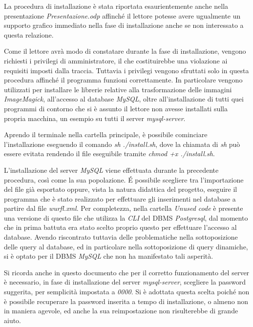 \documentclass[paper=a4, oneside, fontsize=14pt, titlepage]{article}
\begin{document}
			\begin{flushleft}
				La procedura di installazione è stata riportata esaurientemente anche nella presentazione \textit{Presentazione.odp} affinché il lettore potesse avere ugualmente un supporto grafico immediato nella fase di installazione anche se non interessato a questa relazione.\newline
				
				Come il lettore avrà modo di constatare durante la fase di installazione, vengono richiesti i privilegi di amministratore, il che costituirebbe una violazione ai requisiti imposti dalla traccia. Tuttavia i privilegi vengono sfruttati solo in questa procedura affinché il programma funzioni correttamente. In particolare vengono utilizzati per installare le librerie relative alla trasformazione delle immagini \textit{ImageMagick}, all'accesso al database \textit{MySQL}, oltre all'installazione di tutti quei programmi di contorno che si è assunto il lettore non avesse installati sulla propria macchina, un esempio su tutti il server \textit{mysql-server}.\newline
				
				Aprendo il terminale nella cartella principale, è possibile cominciare l'installazione eseguendo il comando \textit{sh ./install.sh}, dove la chiamata di \textit{sh} può essere evitata rendendo il file eseguibile tramite \textit{chmod +x ./install.sh}.
				
				L'installazione del server \textit{MySQL} viene effettuata durante la precedente procedura, così come la sua popolazione. \'{E} possibile scegliere tra l'importazione del file già esportato oppure, vista la natura didattica del progetto, eseguire il programma che è stato realizzato per effettuare gli inserimenti nel database a partire dal file \textit{wurfl.xml}. Per completezza, nella cartella \textit{Unused code} è presente una versione di questo file che utilizza la \textit{CLI} del DBMS \textit{Postgresql}, dal momento che in prima battuta era stato scelto proprio questo per effettuare l'accesso al database. Avendo riscontrato tuttavia delle problematiche nella sottoposizione delle query al database, ed in particolare nella sottoposizione di query dinamiche, si è optato per il DBMS \textit{MySQL} che non ha manifestato tali asperità.
				
				Si ricorda anche in questo documento che per il corretto funzionamento del server è necessario, in fase di installazione del server \textit{mysql-server}, scegliere la password suggerita, per semplicità impostata a \textit{0000}. Si è adottata questa scelta poiché non è possibile recuperare la password inserita a tempo di installazione, o almeno non in maniera agevole, ed anche la sua reimpostazione non risulterebbe di grande aiuto. 
				
			\end{flushleft}
\end{document}
